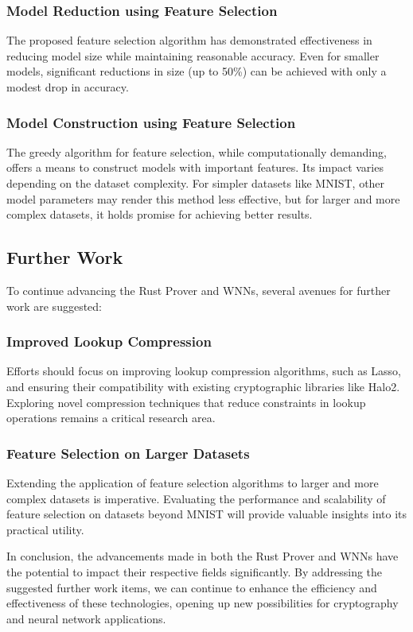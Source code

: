 \documentclass{article}[12pt]
\begin{document}
\subsubsection{Model Reduction using Feature Selection}\label{subsubsec:model-reduction-conclusion}

The proposed feature selection algorithm has demonstrated effectiveness in reducing model size while maintaining reasonable accuracy.
Even for smaller models, significant reductions in size (up to 50\%) can be achieved with only a modest drop in accuracy.

\subsubsection{Model Construction using Feature Selection}\label{subsubsec:model-construction-conclusion}

The greedy algorithm for feature selection, while computationally demanding, offers a means to construct models with important features.
Its impact varies depending on the dataset complexity.
For simpler datasets like MNIST, other model parameters may render this method less effective, but for larger and more complex datasets, it holds promise for achieving better results.

\subsection{Further Work}\label{subsec:further-work}

To continue advancing the Rust Prover and WNNs, several avenues for further work are suggested:

\subsubsection{Improved Lookup Compression}\label{subsubsec:improved-lookup-compression}

Efforts should focus on improving lookup compression algorithms, such as Lasso, and ensuring their compatibility with existing cryptographic libraries like Halo2.
Exploring novel compression techniques that reduce constraints in lookup operations remains a critical research area.

\subsubsection{Feature Selection on Larger Datasets}\label{subsubsec:feature-selection-larger-datasets}

Extending the application of feature selection algorithms to larger and more complex datasets is imperative.
Evaluating the performance and scalability of feature selection on datasets beyond MNIST will provide valuable insights into its practical utility.

In conclusion, the advancements made in both the Rust Prover and WNNs have the potential to impact their respective fields significantly.
By addressing the suggested further work items, we can continue to enhance the efficiency and effectiveness of these technologies, opening up new possibilities for cryptography and neural network applications.


\newpage


\end{document}

